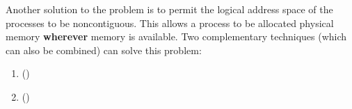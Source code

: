 Another solution to the  problem is to permit the logical address space of the processes to be noncontiguous.
This allows a process to be allocated physical memory \textbf{wherever} memory is available.
Two complementary techniques (which can also be combined) can solve this problem:
\begin{enumerate}[noitemsep]
\item {} ()
\item {} ()
\end{enumerate}


